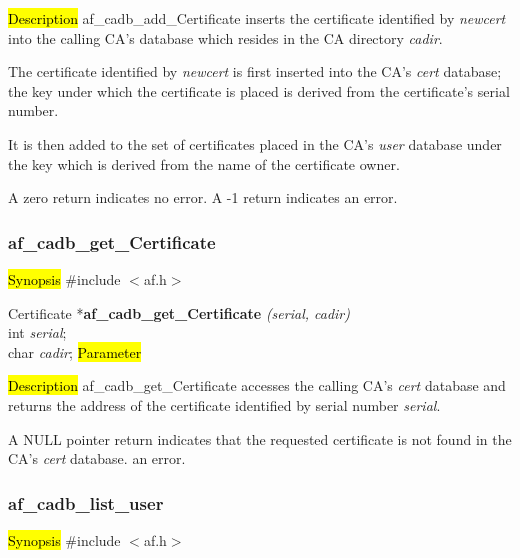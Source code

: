 

\hl{Description}
af\_cadb\_add\_Certificate inserts the certificate identified by {\em newcert} into the 
calling CA's database which resides in the CA directory {\em cadir}. 

The certificate identified by {\em newcert} is first inserted into the CA's {\em cert} database;
the key under which the certificate is placed is derived from the certificate's serial number.

It is then added to the set of certificates placed in the CA's {\em user} database under the key
which is derived from the name of the certificate owner.

A zero return indicates no error.
A -1 return indicates an error.



\subsubsection{af\_cadb\_get\_Certificate}
\label{af_cadb_get_Certificate}
\hl{Synopsis}
\#include $<$af.h$>$

Certificate *{\bf af\_cadb\_get\_Certificate} {\em (serial, cadir)} \\
int  {\em serial}; \\
char {\em *cadir};
\hl{Parameter}


\hl{Description}
af\_cadb\_get\_Certificate accesses the calling CA's {\em cert} database and returns the address of 
the certificate identified by serial number {\em serial}. 

A NULL pointer return indicates
\bi
\m that the requested certificate is not found in the CA's {\em cert} database.
\m an error.
\ei



\subsubsection{af\_cadb\_list\_user}
\label{af_cadb_list_user}
\hl{Synopsis}
\#include $<$af.h$>$

